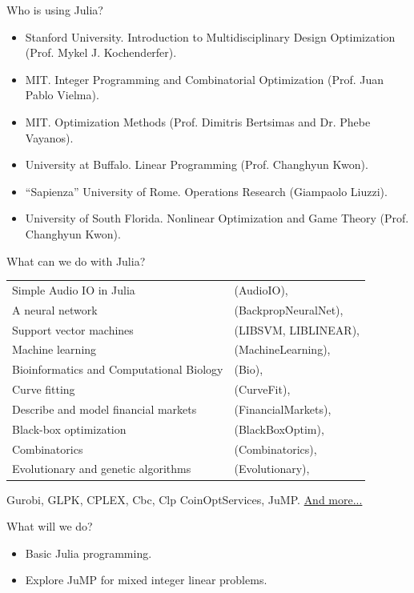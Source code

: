 \documentclass{beamer}
\begin{document}
\begin{frame}{Who is using Julia?}
  \begin{itemize}\footnotesize
  \item[] Stanford University. Introduction to Multidisciplinary Design Optimization (Prof. Mykel J. Kochenderfer).
  \item[] MIT. Integer Programming and Combinatorial Optimization (Prof. Juan Pablo Vielma).
  \item[] MIT. Optimization Methods (Prof. Dimitris Bertsimas and Dr. Phebe Vayanos).
  \item[] University at Buffalo. Linear Programming (Prof. Changhyun Kwon).
  \item[] “Sapienza” University of Rome. Operations Research (Giampaolo Liuzzi).
    \item[] University of South Florida. Nonlinear Optimization and Game Theory (Prof. Changhyun Kwon).
  \end{itemize}
\end{frame}


\begin{frame}{What can we do with Julia?}

  \footnotesize
  \begin{tabular}[htpb]{ll}
    Simple Audio IO in Julia & (AudioIO),\\
    A neural network & (BackpropNeuralNet),\\
   Support vector machines & (LIBSVM, LIBLINEAR),\\
   Machine learning & (MachineLearning),\\
   Bioinformatics and Computational Biology & (Bio),\\
   Curve fitting& (CurveFit),\\
   Describe and model financial markets& (FinancialMarkets),\\
   Black-box optimization& (BlackBoxOptim),\\
   Combinatorics& (Combinatorics),\\
   Evolutionary and genetic algorithms& (Evolutionary),\\
  \end{tabular}
  \vfill
   Gurobi, GLPK, CPLEX, Cbc, Clp CoinOptServices, JuMP.
   \href{http://pkg.julialang.org/}{And more...}
  
\end{frame}

\begin{frame}{What will we do?}
  \begin{itemize}
  \item[] Basic Julia programming.
  \item[] Explore JuMP for mixed integer linear problems.
  \end{itemize}
\end{frame}
\end{document}

